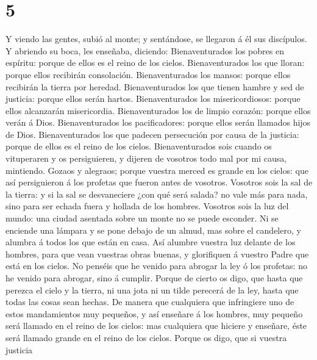 \hypertarget{section-4}{%
\section{5}\label{section-4}}

 Y viendo las gentes, subió al monte; y sentándose, se
llegaron á él sus discípulos.  Y abriendo su boca, les
enseñaba, diciendo:  Bienaventurados los pobres en
espíritu: porque de ellos es el reino de los cielos. 
Bienaventurados los que lloran: porque ellos recibirán consolación.
 Bienaventurados los mansos: porque ellos recibirán la
tierra por heredad.  Bienaventurados los que tienen hambre
y sed de justicia: porque ellos serán hartos. 
Bienaventurados los misericordiosos: porque ellos alcanzarán
misericordia.  Bienaventurados los de limpio corazón:
porque ellos verán á Dios.  Bienaventurados los
pacificadores: porque ellos serán llamados hijos de Dios.
 Bienaventurados los que padecen persecución por causa de
la justicia: porque de ellos es el reino de los cielos. 
Bienaventurados sois cuando os vituperaren y os persiguieren, y dijeren
de vosotros todo mal por mi causa, mintiendo.  Gozaos y
alegraos; porque vuestra merced es grande en los cielos: que así
persiguieron á los profetas que fueron antes de vosotros.
 Vosotros sois la sal de la tierra: y si la sal se
desvaneciere ¿con qué será salada? no vale más para nada, sino para ser
echada fuera y hollada de los hombres.  Vosotros sois la
luz del mundo: una ciudad asentada sobre un monte no se puede esconder.
 Ni se enciende una lámpara y se pone debajo de un almud,
mas sobre el candelero, y alumbra á todos los que están en casa.
 Así alumbre vuestra luz delante de los hombres, para que
vean vuestras obras buenas, y glorifiquen á vuestro Padre que está en
los cielos.  No penséis que he venido para abrogar la ley
ó los profetas: no he venido para abrogar, sino á cumplir.
 Porque de cierto os digo, que hasta que perezca el cielo
y la tierra, ni una jota ni un tilde perecerá de la ley, hasta que todas
las cosas sean hechas.  De manera que cualquiera que
infringiere uno de estos mandamientos muy pequeños, y así enseñare á los
hombres, muy pequeño será llamado en el reino de los cielos: mas
cualquiera que hiciere y enseñare, éste será llamado grande en el reino
de los cielos.  Porque os digo, que si vuestra justicia
